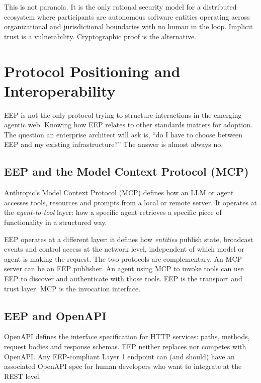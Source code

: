 \documentclass[12pt,a4paper]{article}
\begin{document}
This is not paranoia. It is the only rational security model for a distributed ecosystem where participants are autonomous software entities operating across organizational and jurisdictional boundaries with no human in the loop. Implicit trust is a vulnerability. Cryptographic proof is the alternative.

\section{Protocol Positioning and Interoperability}

EEP is not the only protocol trying to structure interactions in the emerging agentic web. Knowing how EEP relates to other standards matters for adoption. The question an enterprise architect will ask is, ``do I have to choose between EEP and my existing infrastructure?'' The answer is almost always no.

\subsection{EEP and the Model Context Protocol (MCP)}

Anthropic's Model Context Protocol (MCP) defines how an LLM or agent accesses tools, resources and prompts from a local or remote server. It operates at the \textit{agent-to-tool} layer: how a specific agent retrieves a specific piece of functionality in a structured way.

EEP operates at a different layer: it defines how \textit{entities} publish state, broadcast events and control access at the network level, independent of which model or agent is making the request. The two protocols are complementary. An MCP server can be an EEP publisher. An agent using MCP to invoke tools can use EEP to discover and authenticate with those tools. EEP is the transport and trust layer. MCP is the invocation interface.

\subsection{EEP and OpenAPI}

OpenAPI defines the interface specification for HTTP services: paths, methods, request bodies and response schemas. EEP neither replaces nor competes with OpenAPI. Any EEP-compliant Layer 1 endpoint can (and should) have an associated OpenAPI spec for human developers who want to integrate at the REST level.
\end{document}
